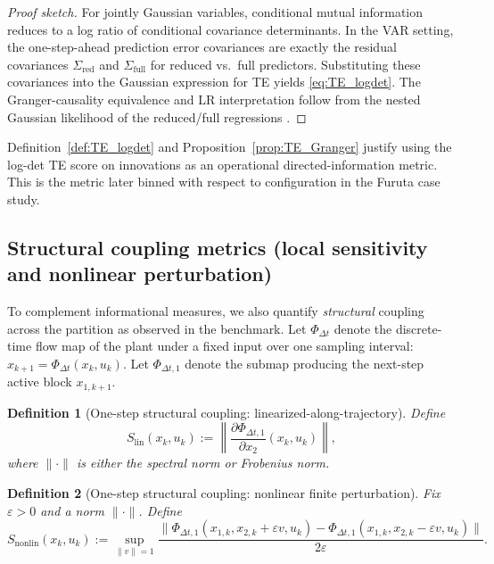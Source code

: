 \documentclass[final,5p,times,twocolumn]{elsarticle}
\newtheorem{definition}{Definition}
\begin{document}
\begin{proof}[Proof sketch]
	For jointly Gaussian variables, conditional mutual information reduces to a log ratio of conditional covariance determinants. In the VAR setting, the one-step-ahead prediction error covariances are exactly the residual covariances $\Sigma_{\mathrm{red}}$ and $\Sigma_{\mathrm{full}}$ for reduced vs.\ full predictors. Substituting these covariances into the Gaussian expression for TE yields \eqref{eq:TE_logdet}. The Granger-causality equivalence and LR interpretation follow from the nested Gaussian likelihood of the reduced/full regressions \citep{Barnett2009_PRL}.
\end{proof}

Definition~\ref{def:TE_logdet} and Proposition~\ref{prop:TE_Granger} justify using the log-det TE score on innovations as an operational directed-information metric. This is the metric later binned with respect to configuration in the Furuta case study.

\subsection{Structural coupling metrics (local sensitivity and nonlinear perturbation)}

To complement informational measures, we also quantify \emph{structural} coupling across the partition as observed in the benchmark. Let $\Phi_{\Delta t}$ denote the discrete-time flow map of the plant under a fixed input over one sampling interval:
$x_{k+1}=\Phi_{\Delta t}(x_k,u_k)$.
Let $\Phi_{\Delta t,1}$ denote the submap producing the next-step active block $x_{1,k+1}$.

\begin{definition}[One-step structural coupling: linearized-along-trajectory]
	\label{def:StrucLin}
	Define
	\begin{equation}
		S_{\mathrm{lin}}(x_k,u_k)
		:= \left\| \frac{\partial \Phi_{\Delta t,1}}{\partial x_2}(x_k,u_k) \right\| ,
		\label{eq:Slin}
	\end{equation}
	where $\|\cdot\|$ is either the spectral norm or Frobenius norm.
\end{definition}

\begin{definition}[One-step structural coupling: nonlinear finite perturbation]
	\label{def:StrucNonlin}
	Fix $\varepsilon>0$ and a norm $\|\cdot\|$. Define
	\begin{equation}
		S_{\mathrm{nonlin}}(x_k,u_k)
		:= \sup_{\|v\|=1}\frac{\|\Phi_{\Delta t,1}(x_{1,k},x_{2,k}+\varepsilon v,u_k)-\Phi_{\Delta t,1}(x_{1,k},x_{2,k}-\varepsilon v,u_k)\|}{2\varepsilon}.
		\label{eq:Snonlin}
	\end{equation}
\end{definition}
\end{document}
